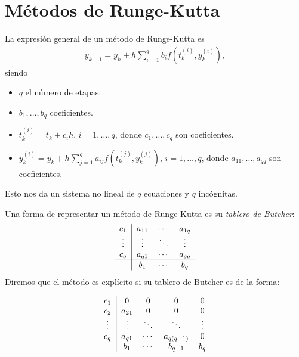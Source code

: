 \section{Métodos de Runge-Kutta}
La expresión general de un método de Runge-Kutta es
\begin{align*}
    \boxed{
    y_{k+1} = y_k + h \sum_{i=1}^{q} b_i f\left(t_k^{(i)},y_k^{(i)}\right),
    }
\end{align*}
siendo
\begin{itemize}
    \item $q$ el número de etapas.
    \item $b_1,\ldots,b_q$ coeficientes.
    \item $t_k^{(i)} = t_k + c_ih$, $i = 1,\ldots,q$, donde $c_1,\ldots,c_q$ son coeficientes.
    \item $y_k^{(i)} = y_k + h\sum_{j=1}^{q} a_{ij}f\left( t_k^{(j)},y_k^{(j)} \right)$, $i = 1,\ldots,q$, donde $a_{11},\ldots,a_{qq}$ son coeficientes.
\end{itemize}
Esto nos da un sistema no lineal de $q$ ecuaciones y $q$ incógnitas.

Una forma de representar un método de Runge-Kutta es su \textit{tablero de Butcher}:
\begin{align*}
    \begin{tabular}{c|ccc}
        $c_1$    & $a_{11}$ & $\cdots$ & $a_{1q}$ \\
        $\vdots$ & $\vdots$ & $\ddots$ & $\vdots$ \\
        $c_q$    & $a_{q1}$ & $\cdots$ & $a_{qq}$ \\ \hline
                 & $b_1$    & $\cdots$ & $b_q$
    \end{tabular}
\end{align*}
Diremos que el método es explícito si su tablero de Butcher es de la forma:

\begin{align*}
    \begin{tabular}{c|cccc}
        $c_1$    & 0        & 0        & 0            & 0        \\
        $c_2$    & $a_{21}$ & 0        & 0            & 0        \\
        $\vdots$ & $\vdots$ & $\ddots$ & $\ddots$     & $\vdots$ \\
        $c_{q}$  & $a_{q1}$ & $\cdots$ & $a_{q(q-1)}$ & 0        \\ \hline
                 & $b_1 $   & $\cdots$ & $ b_{q-1}$   & $b_q$
    \end{tabular}
\end{align*}

